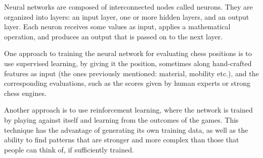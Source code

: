 Neural networks are composed of interconnected nodes called neurons. They are organized into layers: an input layer, one or more hidden layers, and an output layer. Each neuron receives some values as input, applies a mathematical operation, and produces an output that is passed on to the next layer.

One approach to training the neural network for evaluating chess positions is to use supervised learning, by giving it the position, sometimes along hand-crafted features as input (the ones previously mentioned: material, mobility etc.), and the corresponding evaluations, such as the scores given by human experts or strong chess engines.

Another approach is to use reinforcement learning, where the network is trained by playing against itself and learning from the outcomes of the games. This technique has the advantage of generating its own training data, as well as the ability to find patterns that are stronger and more complex than those that people can think of, if sufficiently trained.
